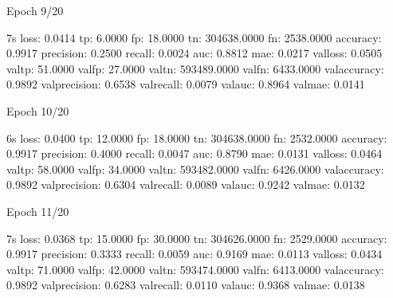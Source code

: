 \documentclass[letterpaper,10pt,english]{sphinxmanual}
\begin{document}
\begin{sphinxVerbatim}[commandchars=\\\{\}]
Epoch 9/20
\end{sphinxVerbatim}

\begin{sphinxVerbatim}[commandchars=\\\{\}]
 \PYGZhy{} 7s \PYGZhy{} loss: 0.0414 \PYGZhy{} tp: 6.0000 \PYGZhy{} fp: 18.0000 \PYGZhy{} tn: 304638.0000 \PYGZhy{} fn: 2538.0000 \PYGZhy{} accuracy: 0.9917 \PYGZhy{} precision: 0.2500 \PYGZhy{} recall: 0.0024 \PYGZhy{} auc: 0.8812 \PYGZhy{} mae: 0.0217 \PYGZhy{} val\PYGZus{}loss: 0.0505 \PYGZhy{} val\PYGZus{}tp: 51.0000 \PYGZhy{} val\PYGZus{}fp: 27.0000 \PYGZhy{} val\PYGZus{}tn: 593489.0000 \PYGZhy{} val\PYGZus{}fn: 6433.0000 \PYGZhy{} val\PYGZus{}accuracy: 0.9892 \PYGZhy{} val\PYGZus{}precision: 0.6538 \PYGZhy{} val\PYGZus{}recall: 0.0079 \PYGZhy{} val\PYGZus{}auc: 0.8964 \PYGZhy{} val\PYGZus{}mae: 0.0141
\end{sphinxVerbatim}

\begin{sphinxVerbatim}[commandchars=\\\{\}]
Epoch 10/20
\end{sphinxVerbatim}

\begin{sphinxVerbatim}[commandchars=\\\{\}]
 \PYGZhy{} 6s \PYGZhy{} loss: 0.0400 \PYGZhy{} tp: 12.0000 \PYGZhy{} fp: 18.0000 \PYGZhy{} tn: 304638.0000 \PYGZhy{} fn: 2532.0000 \PYGZhy{} accuracy: 0.9917 \PYGZhy{} precision: 0.4000 \PYGZhy{} recall: 0.0047 \PYGZhy{} auc: 0.8790 \PYGZhy{} mae: 0.0131 \PYGZhy{} val\PYGZus{}loss: 0.0464 \PYGZhy{} val\PYGZus{}tp: 58.0000 \PYGZhy{} val\PYGZus{}fp: 34.0000 \PYGZhy{} val\PYGZus{}tn: 593482.0000 \PYGZhy{} val\PYGZus{}fn: 6426.0000 \PYGZhy{} val\PYGZus{}accuracy: 0.9892 \PYGZhy{} val\PYGZus{}precision: 0.6304 \PYGZhy{} val\PYGZus{}recall: 0.0089 \PYGZhy{} val\PYGZus{}auc: 0.9242 \PYGZhy{} val\PYGZus{}mae: 0.0132
\end{sphinxVerbatim}

\begin{sphinxVerbatim}[commandchars=\\\{\}]
Epoch 11/20
\end{sphinxVerbatim}

\begin{sphinxVerbatim}[commandchars=\\\{\}]
 \PYGZhy{} 7s \PYGZhy{} loss: 0.0368 \PYGZhy{} tp: 15.0000 \PYGZhy{} fp: 30.0000 \PYGZhy{} tn: 304626.0000 \PYGZhy{} fn: 2529.0000 \PYGZhy{} accuracy: 0.9917 \PYGZhy{} precision: 0.3333 \PYGZhy{} recall: 0.0059 \PYGZhy{} auc: 0.9169 \PYGZhy{} mae: 0.0113 \PYGZhy{} val\PYGZus{}loss: 0.0434 \PYGZhy{} val\PYGZus{}tp: 71.0000 \PYGZhy{} val\PYGZus{}fp: 42.0000 \PYGZhy{} val\PYGZus{}tn: 593474.0000 \PYGZhy{} val\PYGZus{}fn: 6413.0000 \PYGZhy{} val\PYGZus{}accuracy: 0.9892 \PYGZhy{} val\PYGZus{}precision: 0.6283 \PYGZhy{} val\PYGZus{}recall: 0.0110 \PYGZhy{} val\PYGZus{}auc: 0.9368 \PYGZhy{} val\PYGZus{}mae: 0.0138
\end{sphinxVerbatim}
\end{document}
